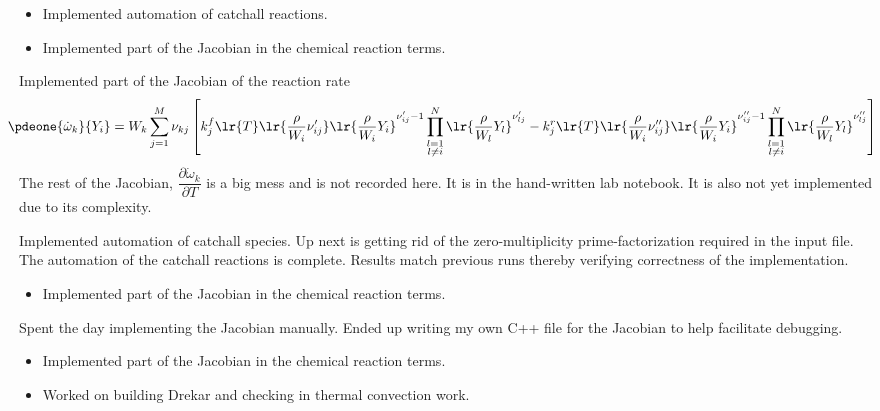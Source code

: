 \begin{itemize}
  \item Implemented automation of catchall reactions.
  \item Implemented part of the Jacobian in the chemical reaction terms.
\end{itemize}


Implemented part of the Jacobian of the reaction rate
\begin{align*}
  \hspace{-1.0em}\pdeone{\dot\omega_{k}}{Y_{i}} = W_{k}\sum_{j=1}^{M}\nu_{kj}\left[k_{j}^{f}\lr{T}\lr{\frac{\rho}{W_{i}}\nu_{ij}^{\prime}}\lr{\frac{\rho}{W_{i}}Y_{i}}^{\nu_{ij}^{\prime}-1}\prod_{\substack{l=1 \\ l\neq i}}^{N}\lr{\frac{\rho}{W_{l}}Y_{l}}^{\nu_{lj}^{\prime}} - k_{j}^{r}\lr{T}\lr{\frac{\rho}{W_{i}}\nu_{ij}^{\prime\prime}}\lr{\frac{\rho}{W_{i}}Y_{i}}^{\nu_{ij}^{\prime\prime}-1}\prod_{\substack{l=1 \\ l\neq i}}^{N}\lr{\frac{\rho}{W_{l}}Y_{l}}^{\nu_{lj}^{\prime\prime}}\right]
\end{align*}
The rest of the Jacobian, $\dfrac{\partial\dot\omega_{k}}{\partial T}$ is a big mess and is not recorded here.  It is in the hand-written lab notebook.  It is also not yet implemented due to its complexity.

Implemented automation of catchall species.  Up next is getting rid of the zero-multiplicity prime-factorization required in the input file.
The automation of the catchall reactions is complete.  Results match previous runs thereby verifying correctness of the implementation.

\begin{itemize}
  \item Implemented part of the Jacobian in the chemical reaction terms.
\end{itemize}


Spent the day implementing the Jacobian manually.  Ended up writing my own C++ file for the Jacobian to help facilitate debugging.

\begin{itemize}
  \item Implemented part of the Jacobian in the chemical reaction terms.
  \item Worked on building Drekar and checking in thermal convection work.
\end{itemize}

